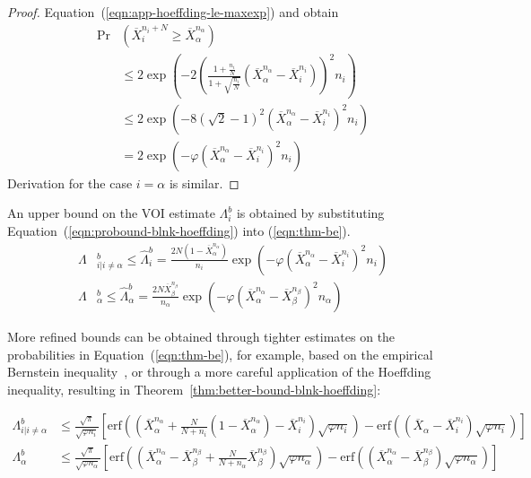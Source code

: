 \begin{proof}
	Equation~(\ref{eqn:app-hoeffding-le-maxexp}) and obtain
	\begin{align}
	\Pr&(\overline X_i^{n_i+N}\ge \overline X_\alpha^{n_\alpha}) \nonumber\\
	& \le 2\exp\left(-2\left( \frac {1+\frac {n_i} N} {1+\sqrt {\frac {n_i} N}}
	                          (\overline X_\alpha^{n_\alpha} - \overline X_i^{n_i})\right)^2 n_i\right)\nonumber \\
	& \le 2\exp(-8(\sqrt 2 - 1)^2(\overline X_\alpha^{n_\alpha} - \overline X_i^{n_i})^2n_i)\nonumber\\
	& = 2\exp(-\varphi(\overline X_\alpha^{n_\alpha} - \overline X_i^{n_i})^2n_i)
	\end{align}
	Derivation for the case $i=\alpha$ is similar.
\end{proof}	

\begin{crl}
An upper bound on the VOI estimate $\Lambda_i^b$ is obtained
by substituting Equation~(\ref{eqn:probound-blnk-hoeffding}) into (\ref{eqn:thm-be}).
\begin{align}
  \label{eqn:bound-blnk-hoeffding}
  \Lambda&_{i|i\ne\alpha}^b\le \hat\Lambda_i^b=  \frac {2N(1-\overline  X_\alpha^{n_\alpha})} {n_i}\exp\left(- \varphi(\overline X_\alpha^{n_\alpha} - \overline X_i^{n_i})^2 n_i\right)\\
  \Lambda&_\alpha^b \le \hat\Lambda_\alpha^b=\frac {2N\overline X_\beta^{n_\beta}} {n_\alpha}\exp\left(- \varphi(\overline X_\alpha^{n_\alpha} - \overline X_\beta^{n_\beta})^2 n_\alpha\right)\nonumber
\end{align}
\label{crl:bound-blnk-hoeffding}
\end{crl}

More refined bounds can be obtained through tighter estimates on the
probabilities in Equation~(\ref{eqn:thm-be}), for example, based on the empirical Bernstein
inequality~\cite{MaurerPontil.benrstein}, or through a more careful
application of the Hoeffding inequality, resulting in Theorem~\ref{thm:better-bound-blnk-hoeffding}:
\begin{thm}
\begin{align}
\Lambda_{i|i\ne \alpha}^b&\le\frac {\sqrt \pi} {\sqrt {\varphi n_i}}
  \left[\mathrm{erf}\left(\left(\overline X_\alpha^{n_\alpha}+\frac N {N+n_i}(1-\overline X_\alpha^{n_\alpha})-\overline X_i^{n_i}\right)\sqrt {\varphi n_i}\right)
      -\mathrm{erf}\left((\overline X_\alpha - \overline X_i^{n_i})\sqrt{\varphi n_i}\right)\right]\nonumber\\
\Lambda_\alpha^b&\le\frac {\sqrt \pi} {\sqrt {\varphi n_\alpha}}
  \left[\mathrm{erf}\left(\left(\overline X_\alpha^{n_\alpha}-\overline X_\beta^{n_\beta}+\frac N {N+n_\alpha} \overline X_\beta^{n_\beta}\right)\sqrt {\varphi n_\alpha}\right)
      -\mathrm{erf}\left((\overline X_\alpha^{n_\alpha} - \overline X_\beta^{n_\beta})\sqrt{\varphi n_\alpha}\right)\right]
\label{eqn:erf-blinkered}
\end{align}
\label{thm:better-bound-blnk-hoeffding}
\end{thm}

